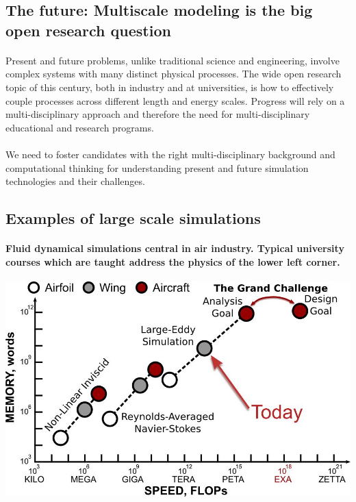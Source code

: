 \documentclass[%
oneside,                 %
final,                   %
10pt]{article}
\begin{document}
\subsection*{The future: Multiscale modeling is the big open research question}


\paragraph{}
Present and future problems, unlike traditional
science and engineering, involve complex systems with many distinct
physical processes. The wide open research topic of this century, both
in industry and at universities, is how to effectively couple
processes across different length and energy scales. Progress will
rely on a multi-disciplinary approach and therefore the  need for
multi-disciplinary educational and research programs.




\paragraph{}
We need to foster candidates with the right
multi-disciplinary background and computational thinking for
understanding present and future simulation technologies and their challenges.




\subsection*{Examples of large scale simulations}

\paragraph{Fluid dynamical simulations central in air industry.  Typical university courses which are taught address the physics of the lower left corner.}


\centerline{\includegraphics[width=0.6\linewidth]{fig-future/fig10.jpg}}
\end{document}
